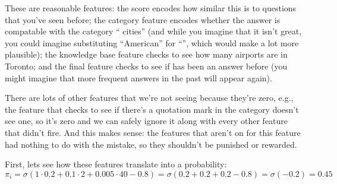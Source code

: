 These are reasonable features: the  score encodes how similar this is
to questions that you've seen before;
%
the category feature encodes whether the answer is compatable with the
category `` cities'' (and while you imagine that it isn't great, you
could imagine substituting ``American'' for ``'', which would make
 a lot more plausible);
%
the knowledge base feature checks to see how many airports are in Toronto;
%
and the final feature checks to see if  has been an answer
before (you might imagine that more frequent answers in the past will appear
again).

There are lots of other features that we're not seeing
because they're zero, e.g., the feature that checks to see if there's
a quotation mark in the category doesn't see one, so it's zero and we
can safely ignore it along with every other feature that didn't fire.
%
And this makes sense: the features that aren't on for this feature had
nothing to do with the mistake, so they shouldn't be punished or
rewarded.

First, lets see how these features translate into a probability:
\begin{equation}
  \pi_i = \sigma \left( 1\cdot 0.2+0.1\cdot 2+ 0.005 \cdot 40 - 0.8 \right) =
  \sigma \left( 0.2 + 0.2 + 0.2 - 0.8 \right) = \sigma \left( -0.2 \right) = 0.45
\end{equation}

